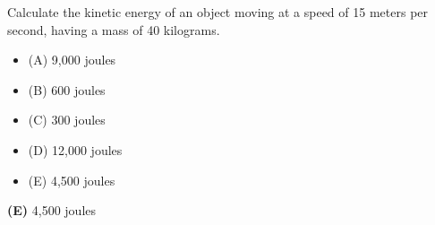 

Calculate the kinetic energy of an object moving at a speed of 15 meters per second, having a mass of 40 kilograms.

\begin{itemize}
\item{(A)} 9,000 joules
\vskip 5pt 
\item{(B)} 600 joules
\vskip 5pt 
\item{(C)} 300 joules
\vskip 5pt 
\item{(D)} 12,000 joules
\vskip 5pt 
\item{(E)} 4,500 joules
\end{itemize}







{\bf (E)} 4,500 joules
 










